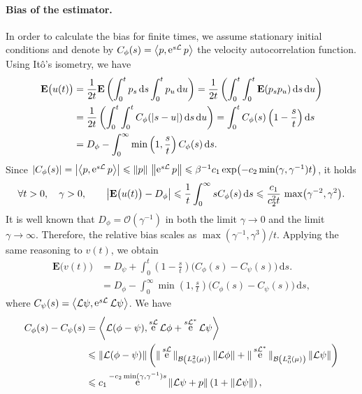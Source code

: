 \documentclass[11pt,a4paper]{article}
\DeclareMathOperator{\e}{e}
\newcommand{\expect}[0]{\mathbf{E}}
\renewcommand{\d}{\mathrm d}
\theoremstyle{plain}
\numberwithin{equation}{section}
\renewcommand{\leq}{\leqslant}
\begin{document}
\paragraph{Bias of the estimator.}%
In order to calculate the bias for finite times,
we assume stationary initial conditions and denote by $C_{\phi}(s) = \ip{p}{\e^{s \mathcal L} p}$ the velocity autocorrelation function.
Using It\^o's isometry, we have
\begin{align*}
    \expect \bigl(u(t)\bigr)
    &= \frac{1}{2t} \expect \left( \int_{0}^{t} p_s \, \d s \int_{0}^{t} p_u \, \d u \right)
    = \frac{1}{2t} \left( \int_{0}^{t} \int_{0}^{t} \expect (p_s p_u) \, \d s \, \d u \right) \\
    &= \frac{1}{2t} \left( \int_{0}^{t} \int_{0}^{t} C_{\phi}(\abs{s - u}) \, \d s \, \d u \right)
    =  \int_{0}^{t} C_{\phi}(s) \left(1 - \frac{s}{t}\right) \d s  \\
    &= D_{\phi} - \int_{0}^{\infty} \min\left(1, \frac{s}{t}\right) C_{\phi}(s) \, \d s.
\end{align*}
Since $\abs{C_{\phi}(s)} = \abs{\ip{p}{\e^{s \mathcal L} p}} \leq \norm{p} \, \norm{\e^{s \mathcal L} p} \leq \beta^{-1} c_1 \exp\bigl( - c_2 \min(\gamma, \gamma^{-1}) t\bigr)$, it holds
\[
    \forall t > 0, \quad \gamma > 0, \qquad
    \abs{\expect\bigl(u(t)\bigr) - D_{\phi}}
    \leq \frac{1}{t}\int_{0}^{\infty} s C_{\phi}(s) \, \d s
    \leq \frac{c_1}{c_2^2 t} \, \max\bigl(\gamma^{-2}, \gamma^2\bigr).
\]
It is well known that $D_{\phi} = \mathcal O(\gamma^{-1})$ in both the limit $\gamma \to 0$ and the limit $\gamma \to \infty$.
Therefore, the relative bias scales as $\max(\gamma^{-1}, \gamma^3) / t$.
Applying the same reasoning to $v(t)$, we obtain
\begin{align*}
    \expect \bigl(v(t)\bigr)
    &= D_{\psi} + \int_{0}^{t} \left(1 - \frac{s}{t}\right) \bigl( C_{\phi}(s) - C_{\psi}(s) \bigr) \, \d s. \\
    &= D_{\phi} - \int_{0}^{\infty} \min\left(1, \frac{s}{t}\right) \bigl( C_{\phi}(s) - C_{\psi}(s) \bigr) \, \d s,
\end{align*}
where $C_{\psi}(s) = \ip{\mathcal L \psi}{\e^{s \mathcal L} \mathcal L \psi}$.
We have
\begin{align*}
    C_{\phi}(s) - C_{\psi}(s)
    &= \ip{\mathcal L (\phi - \psi)}{\e^{s \mathcal L} \mathcal L \phi + \e^{s \mathcal L^*} \mathcal  L\psi} \\
    &\leq \norm{\mathcal L(\phi - \psi)}
    \left( \norm*{\e^{s \mathcal L}}[\mathcal B\left(L^2_0(\mu) \right)] \norm{\mathcal L \phi} + \norm*{\e^{s \mathcal L^*}}[\mathcal B\left(L^2_0(\mu) \right)] \norm{\mathcal L \psi} \right) \\
    &\leq c_1 \e^{-c_2 \min(\gamma, \gamma^{-1}) s} \norm{\mathcal L\psi + p}  \left(1 + \norm{\mathcal L \psi} \right),
\end{align*}
\end{document}
